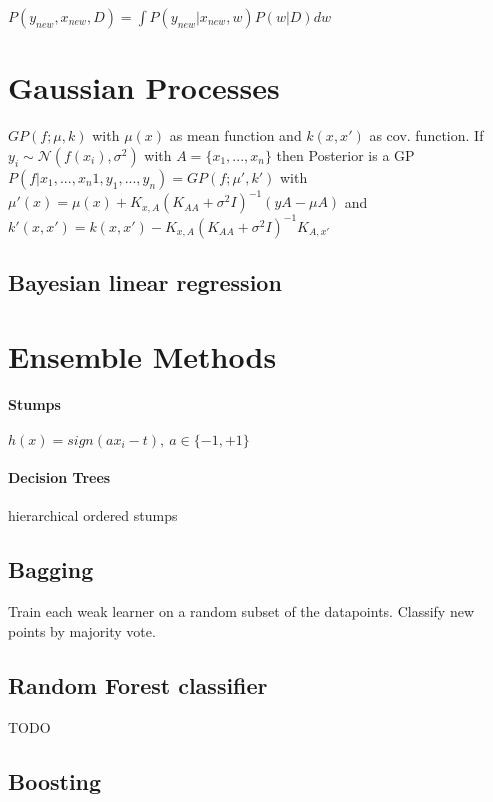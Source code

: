 \documentclass[11pt,twocolumn]{article}
\begin{document}
$P(y_{new}, x_{new}, D) = \int  P(y_{new}|x_{new}, w) P(w|D) dw$

\section{Gaussian Processes}

$GP(f; \mu, k)$ with $\mu(x)$ as mean function and $k(x,x')$ as cov. function. If $y_i \sim \mathcal{N}(f(x_i), \sigma^2)$ with $A = \lbrace x_1,...,x_n \rbrace$ then Posterior is a GP $P(f|x_1,...,x_n1,y_1,...,y_n) = GP(f;\mu' , k' )$ with $\mu'(x) = \mu(x) + K _{x,A}(K_{AA}+\sigma^2 I)^{-1}(y A - \mu A)$ and $k' (x,x' ) = k(x,x')  - K_{x,A}(K_{AA} + \sigma^2I )^{-1} K_{A,x'}$



\subsection{Bayesian linear regression}




\section{Ensemble Methods}

\paragraph{Stumps}
$h(x) = sign(ax_i - t), ~a \in \lbrace-1,+1\rbrace $ 

\paragraph{Decision Trees} hierarchical ordered stumps

\subsection{Bagging}
Train each weak learner on a random subset of the datapoints. Classify new points by majority vote.

\subsection{Random Forest classifier}
TODO

\subsection{Boosting}
\end{document}
